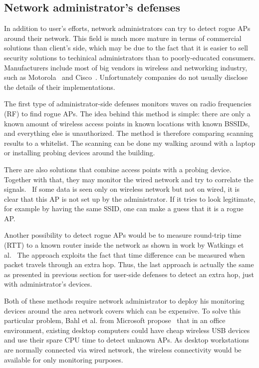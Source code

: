 \documentclass[12pt,a4paper,oneside,pdftex]{report}
\begin{document}
\subsection{Network administrator's defenses}

In addition to user's efforts, network administrators can try to detect rogue APs around their network. This field is much more mature in terms of commercial solutions than client's side, which may be due to the fact that it is easier to sell security solutions to techinical administrators than to poorly-educated consumers. Manufacturers include most of big vendors in wireless and networking industry, such as Motorola~\cite{motorola_airdefense} and Cisco~\cite{cisco_ips}. Unfortunately companies do not usually disclose the details of their implementations.

The first type of administrator-side defenses monitors waves on radio frequencies (RF) to find rogue APs. The idea behind this method is simple: there are only a known amount of wireless access points in known locations with known BSSIDs, and everything else is unauthorized. The method is therefore comparing scanning results to a whitelist. The scanning can be done my walking around with a laptop or installing probing devices around the building.~\cite{proxim_rogue_ap}

There are also solutions that combine access points with a probing device. Together with that, they may monitor the wired network and try to correlate the signals.~\cite{proxim_rogue_ap} If some data is seen only on wireless network but not on wired, it is clear that this AP is not set up by the administrator. If it tries to look legitimate, for example by having the same SSID, one can make a guess that it is a rogue AP.

Another possibility to detect rogue APs would be to measure round-trip time (RTT) to a known router inside the network as shown in work by Watkings et al.~\cite{watkins2007passive} The approach exploits the fact that time difference can be measured when packet travels through an extra hop. Thus, the last approach is actually the same as presented in previous section for user-side defenses to detect an extra hop, just with administrator's devices.

Both of these methods require network administrator to deploy his monitoring devices around the area network covers which can be expensive. To solve this particular problem, Bahl et al. from Microsoft propose~\cite{bahl2005dair} that in an office environment, existing desktop computers could have cheap wireless USB devices and use their spare CPU time to detect unknown APs. As desktop workstations are normally connected via wired network, the wireless connectivity would be available for only monitoring purposes.
\end{document}
